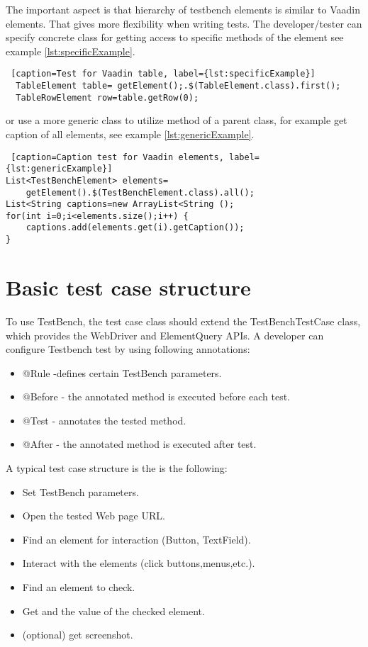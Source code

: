 The important aspect is that hierarchy of testbench elements is similar to Vaadin elements.
That gives more flexibility when writing tests. The  developer/tester can
specify concrete class for getting access to specific methods of the element see example \ref{lst:specificExample}.
 
\lstset{style=a1listing}
\begin{lstlisting} [caption=Test for Vaadin table, label={lst:specificExample}]
  TableElement table= getElement();.$(TableElement.class).first();
  TableRowElement row=table.getRow(0);
 \end{lstlisting}
 
or use a more generic class to utilize method of a parent class, for example get
caption of all elements, see example \ref{lst:genericExample}.

\lstset{style=a1listing}
\begin{lstlisting} [caption=Caption test for Vaadin elements, label={lst:genericExample}]
List<TestBenchElement> elements=
	getElement().$(TestBenchElement.class).all();
List<String captions=new ArrayList<String ();
for(int i=0;i<elements.size();i++) {
	captions.add(elements.get(i).getCaption());
}
\end{lstlisting}

\section {Basic test case structure}
To use TestBench, the test case class should extend the TestBenchTestCase class,
which provides the WebDriver and ElementQuery APIs. A developer
can configure Testbench test by using following annotations:
\begin{itemize}
  \item @Rule -defines certain TestBench parameters.
  \item @Before - the annotated method is executed before each test.
  \item @Test - annotates the tested method.
  \item @After - the annotated method is executed after test.
\end{itemize}

A typical test case structure is the is the following:
\begin{itemize}
  \item Set TestBench parameters.
  \item Open the tested Web page URL.
  \item Find an element for interaction (Button, TextField).
  \item Interact with the elements (click buttons,menus,etc.).
  \item Find an element to check.
  \item Get and the value of the checked element.
  \item (optional) get screenshot.
\end{itemize}

